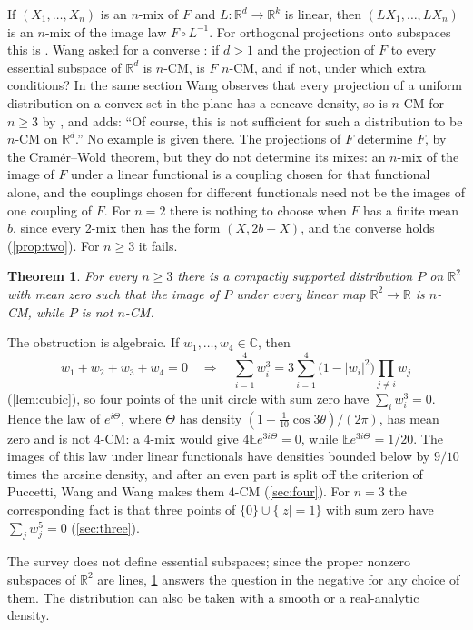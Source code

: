 \documentclass[11pt]{article}
\newtheorem{theorem}{Theorem}[section]
\theoremstyle{definition}
\theoremstyle{remark}
\newcommand{\R}{\mathbb{R}}
\newcommand{\C}{\mathbb{C}}
\newcommand{\E}{\mathbb{E}}
\begin{document}
If $(X_1,\dots,X_n)$ is an $n$-mix of $F$ and $L\colon\R^d\to\R^k$ is linear, then $(LX_1,\dots,LX_n)$ is an
$n$-mix of the image law $F\circ L^{-1}$. For orthogonal projections onto subspaces this is \cite[Proposition~6]{Wang}. Wang asked for a converse
\cite[Open Problem~6]{Wang}: if $d>1$ and the projection of $F$ to every essential subspace of $\R^d$ is $n$-CM,
is $F$ $n$-CM, and if not, under which extra conditions? In the same section Wang observes that every projection of a uniform distribution on a convex
set in the plane has a concave density, so is $n$-CM for $n\ge3$ by \cite{PWW12}, and adds: ``Of course, this is not
sufficient for such a distribution to be $n$-CM on $\R^d$.'' No example is given there. The projections of $F$ determine $F$, by the
Cram\'er--Wold theorem, but they do not determine its mixes: an $n$-mix of the image of $F$ under a linear
functional is a coupling chosen for that functional alone, and the couplings chosen for different functionals
need not be the images of one coupling of $F$. For $n=2$ there is nothing to choose when $F$ has a finite mean
$b$, since every $2$-mix then has the form $(X,2b-X)$, and the converse holds (\cref{prop:two}). For $n\ge3$ it
fails.

\begin{theorem}\label{thm:main}
For every $n\ge3$ there is a compactly supported distribution $P$ on $\R^2$ with mean zero such that the image of
$P$ under every linear map $\R^2\to\R$ is $n$-CM, while $P$ is not $n$-CM.
\end{theorem}

The obstruction is algebraic. If $w_1,\dots,w_4\in\C$, then
\[
w_1+w_2+w_3+w_4=0\quad\Longrightarrow\quad\sum_{i=1}^4 w_i^3=3\sum_{i=1}^4\bigl(1-|w_i|^2\bigr)\prod_{j\ne i}w_j
\]
(\cref{lem:cubic}), so four points of the unit circle with sum zero have $\sum_iw_i^3=0$. Hence the law of
$e^{i\Theta}$, where $\Theta$ has density $(1+\frac1{10}\cos3\theta)/(2\pi)$, has mean zero and is not $4$-CM: a $4$-mix would give
$4\E e^{3i\Theta}=0$, while $\E e^{3i\Theta}=1/20$. The images of this law under linear functionals have densities
bounded below by $9/10$ times the arcsine density, and after an even part is split off the criterion of Puccetti,
Wang and Wang \cite[Theorem~3.4]{PWW13} makes them $4$-CM (\cref{sec:four}). For $n=3$ the corresponding fact is
that three points of $\{0\}\cup\{|z|=1\}$ with sum zero have $\sum_jw_j^5=0$ (\cref{sec:three}).

The survey does not define essential subspaces; since the proper nonzero subspaces of $\R^2$ are lines,
\cref{thm:main} answers the question in the negative for any choice of them. The distribution can also be taken
with a smooth or a real-analytic density.
\end{document}
